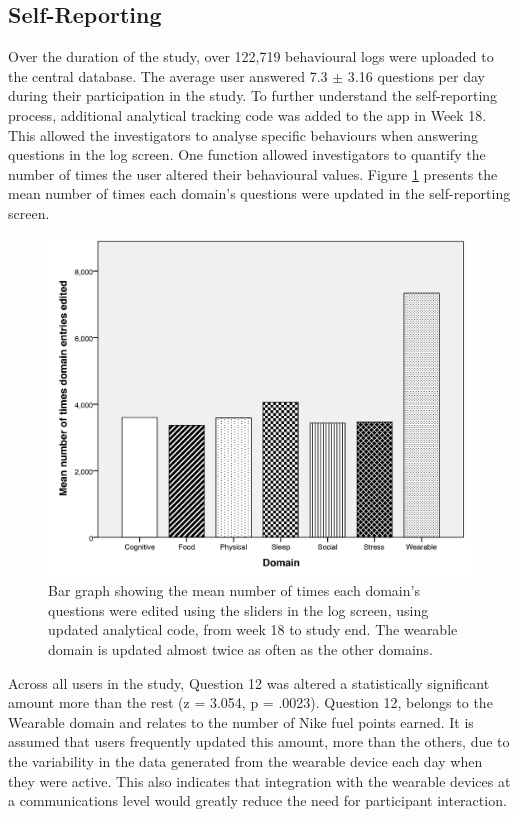 \subsection{Self-Reporting}
Over the duration of the study, over 122,719 behavioural logs were uploaded to the central database. The average user answered 7.3 $ \pm $ 3.16 questions per day during their participation in the study. To further understand the self-reporting process, additional analytical tracking code was added to the app in Week 18. This allowed the investigators to analyse specific behaviours when answering questions in the log screen. One function allowed investigators to quantify the number of times the user altered their behavioural values. Figure \ref{fig: bargraph-questionedits} presents the mean number of times each domain's questions were updated in the self-reporting screen.

 \begin{figure}[h]
    \centering
    \includegraphics[scale=0.2, angle=0]{Files/prevention-study-3/figures/domain-edits}
    \caption{Bar graph showing the mean number of times each domain’s questions were edited using the sliders in the log screen, using updated analytical code, from week 18 to study end. The wearable domain is updated almost twice as often as the other domains.}
    \label{fig: bargraph-questionedits}
\end{figure}

Across all users in the study, Question 12 was altered a statistically significant amount more than the rest (z = 3.054, p = .0023). Question 12, belongs to the Wearable domain and relates to the number of Nike fuel points earned. It is assumed that users frequently updated this amount, more than the others, due to the variability in the data generated from the wearable device each day when they were active. This also indicates that integration with the wearable devices at a communications level would greatly reduce the need for participant interaction.

